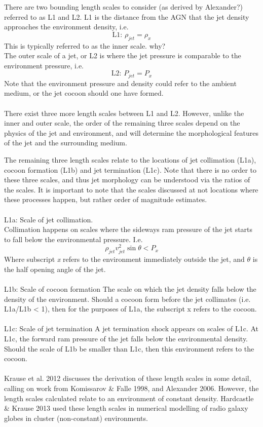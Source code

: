 \documentclass[12pt]{article}
\begin{document}
There are two bounding length scales to consider (as derived by Alexander?) referred to as L1 and L2. L1 is the distance from the AGN that the jet density approaches the environment density, i.e.
\begin{equation}
\text{L1: }\rho_{jet} = \rho_x
\end{equation}
This is typically referred to as the inner scale. why?\\
The outer scale of a jet, or L2 is where the jet pressure is comparable to the environment pressure, i.e.
\begin{equation}
\text{L2: }P_{jet} = P_{x}
\end{equation}
Note that the environment pressure and density could refer to the ambient medium, or the jet cocoon should one have formed.\\
\\
There exist three more length scales between L1 and L2. However, unlike the inner and outer scale, the order of the remaining three scales depend on the physics of the jet and environment, and will determine the morphological features of the jet and the surrounding medium.

The remaining three length scales relate to the locations of jet collimation (L1a), cocoon formation (L1b) and jet termination (L1c). Note that there is no order to these three scales, and thus jet morphology can be understood via the ratios of the scales. It is important to note that the scales discussed at not locations where these processes happen, but rather order of magnitude estimates.\\
\\
L1a: Scale of jet collimation.\\
Collimation happens on scales where the sideways ram pressure of the jet starts to fall below the environmental pressure. I.e.
\begin{equation}
\rho_{jet}v_{jet}^{2}\sin{\theta} < P_{x}
\end{equation}
Where subscript \textit{x} refers to the environment immediately outside the jet, and $\theta$ is the half opening angle of the jet.\\
\\
L1b: Scale of cocoon formation
The scale on which the jet density falls below the density of the environment. Should a cocoon form before the jet collimates (i.e. L1a/L1b < 1), then for the purposes of L1a, the subscript x refers to the cocoon.\\
\\
L1c: Scale of jet termination
A jet termination shock appears on scales of L1c. At L1c, the forward ram pressure of the jet falls below the environmental density. Should the scale of L1b be smaller than L1c, then this environment refers to the cocoon.\\
\\
Krause et al. 2012 discusses the derivation of these length scales in some detail, calling on work from Komissarov \& Falle 1998, and Alexander 2006. However, the length scales calculated relate to an environment of constant density. Hardcastle \& Krause 2013 used these length scales in numerical modelling of radio galaxy globes in cluster (non-constant) environments.
\end{document}
